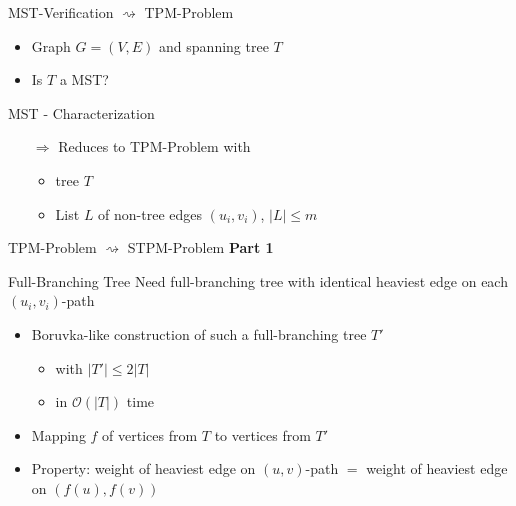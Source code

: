 \documentclass[18pt]{beamer}
\begin{document}
\begin{frame}{MST-Verification $	\rightsquigarrow$ TPM-Problem}
	\begin{itemize}
		\item Graph $G=(V,E)$ and spanning tree $T$
		\item Is $T$ a MST? 
	\end{itemize}
	\begin{block}{MST - Characterization}
\end{block}
		
		\bigskip
		\pause
	\begin{itemize}
		\item [$\Rightarrow$] Reduces to TPM-Problem with 
		\begin{itemize}
			\item tree $T$
			\item List $L$ of non-tree edges $(u_i,v_i)$, $|L| \le m$
		\end{itemize}
	\end{itemize}
\end{frame}
\begin{frame}{TPM-Problem $	\rightsquigarrow$ STPM-Problem}
	\textbf{Part 1}
	\begin{block}{Full-Branching Tree}
		Need {\color{blue} full-branching tree} with identical heaviest edge on each $(u_i,v_i)$-path
	\end{block}
	\begin{itemize}
		\item Boruvka-like construction of such a full-branching tree $T'$
		\begin{itemize}
			\item with $|T'| \le 2|T|$
			\item in $\mathcal{O}(|T|)$ time
		\end{itemize}
	    \item Mapping $f$ of vertices from $T$ to vertices from $T'$ 
	    \item Property: weight of  heaviest edge on $(u,v)$-path $=$ weight of heaviest edge on $(f(u),f(v))$
	\end{itemize}
	

	
\end{frame}
\end{document}
